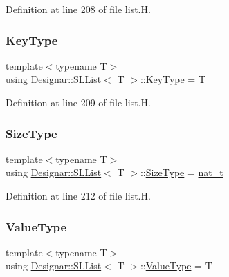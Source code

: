 Definition at line 208 of file list.\+H.

\mbox{\label{class_designar_1_1_s_l_list_a0f9ac3eaee2d1a9e6091aaaac825ccb2}} 
\subsubsection{\texorpdfstring{Key\+Type}{KeyType}}
{\footnotesize\ttfamily template$<$typename T$>$ \\
using \hyperlink{class_designar_1_1_s_l_list}{Designar\+::\+S\+L\+List}$<$ T $>$\+::\hyperlink{class_designar_1_1_s_l_list_a0f9ac3eaee2d1a9e6091aaaac825ccb2}{Key\+Type} =  T}



Definition at line 209 of file list.\+H.

\mbox{\label{class_designar_1_1_s_l_list_a253792b5e9c19ea61fb49e5e83f6159b}} 
\subsubsection{\texorpdfstring{Size\+Type}{SizeType}}
{\footnotesize\ttfamily template$<$typename T$>$ \\
using \hyperlink{class_designar_1_1_s_l_list}{Designar\+::\+S\+L\+List}$<$ T $>$\+::\hyperlink{class_designar_1_1_s_l_list_a253792b5e9c19ea61fb49e5e83f6159b}{Size\+Type} =  \hyperlink{namespace_designar_aa72662848b9f4815e7bf31a7cf3e33d1}{nat\+\_\+t}}



Definition at line 212 of file list.\+H.

\mbox{\label{class_designar_1_1_s_l_list_a22813e78b0dea3a55f47d5f476fd99a1}} 
\subsubsection{\texorpdfstring{Value\+Type}{ValueType}}
{\footnotesize\ttfamily template$<$typename T$>$ \\
using \hyperlink{class_designar_1_1_s_l_list}{Designar\+::\+S\+L\+List}$<$ T $>$\+::\hyperlink{class_designar_1_1_s_l_list_a22813e78b0dea3a55f47d5f476fd99a1}{Value\+Type} =  T}



